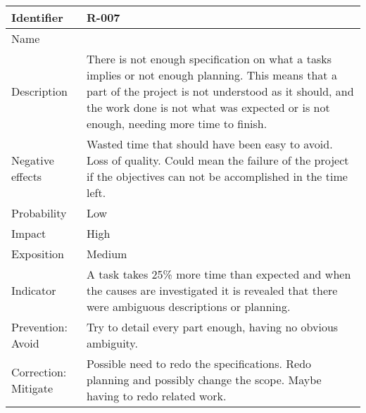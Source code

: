 \begin{table}[H]
	\begin{tabularx}{\textwidth}{|y|z|}
		\hline
		Identifier & \textbf{R-007} \\ \hline
		Name & \Rsiete \\ \hline
		Description &
			There is not enough specification on what a tasks implies or not enough planning. \linej
			This means that a part of the project is not understood as it should, and the work done is not what was expected or is not enough, needing more time to finish.
		\\ \hline
		Negative effects &
			Wasted time that should have been easy to avoid. \linej
			Loss of quality. \linej
			Could mean the failure of the project if the objectives can not be accomplished in the time left.
		\\ \hline
		Probability & Low\\ \hline
		Impact &  High\\ \hline
		Exposition &  Medium\\ \hline
		Indicator & A task takes 25\% more time than expected and when the causes are investigated it is revealed that there were ambiguous descriptions or planning.\\ \hline
		Prevention: Avoid &
			Try to detail every part enough, having no obvious ambiguity.
		\\ \hline
		Correction: Mitigate &
			Possible need to redo the specifications.  \linej
			Redo planning and possibly change the scope.  \linej
			Maybe having to redo related work.
		\\ \hline
	\end{tabularx}
\end{table}


